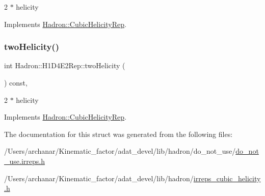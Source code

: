 2 $\ast$ helicity 

Implements \mbox{\hyperlink{structHadron_1_1CubicHelicityRep_af507aa56fc2747eacc8cb6c96db31ecc}{Hadron\+::\+Cubic\+Helicity\+Rep}}.

\mbox{\label{structHadron_1_1H1D4E2Rep_a47b668915545d363a373bd37f3bfb75f}} 
\subsubsection{\texorpdfstring{twoHelicity()}{twoHelicity()}\hspace{0.1cm}{\footnotesize\ttfamily [2/2]}}
{\footnotesize\ttfamily int Hadron\+::\+H1\+D4\+E2\+Rep\+::two\+Helicity (\begin{DoxyParamCaption}{ }\end{DoxyParamCaption}) const\hspace{0.3cm}{\ttfamily [inline]}, {\ttfamily [virtual]}}

2 $\ast$ helicity 

Implements \mbox{\hyperlink{structHadron_1_1CubicHelicityRep_af507aa56fc2747eacc8cb6c96db31ecc}{Hadron\+::\+Cubic\+Helicity\+Rep}}.



The documentation for this struct was generated from the following files\+:\begin{DoxyCompactItemize}
\item 
/\+Users/archanar/\+Kinematic\+\_\+factor/adat\+\_\+devel/lib/hadron/do\+\_\+not\+\_\+use/\mbox{\hyperlink{do__not__use_8irreps_8h}{do\+\_\+not\+\_\+use.\+irreps.\+h}}\item 
/\+Users/archanar/\+Kinematic\+\_\+factor/adat\+\_\+devel/lib/hadron/\mbox{\hyperlink{lib_2hadron_2irreps__cubic__helicity_8h}{irreps\+\_\+cubic\+\_\+helicity.\+h}}\end{DoxyCompactItemize}
